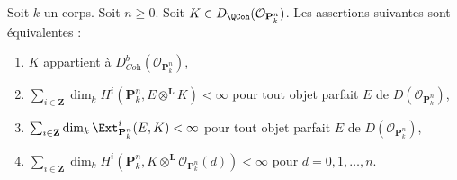 \begin{lemma}
\label{lemma-coherent-on-projective-space}
Soit $k$ un corps. Soit $n \geq 0$. Soit
$K \in D_\QCoh(\mathcal{O}_{\mathbf{P}^n_k})$.
Les assertions suivantes sont équivalentes :
\begin{enumerate}
\item $K$ appartient à $D^b_{\textit{Coh}}(\mathcal{O}_{\mathbf{P}^n_k})$,
\item $\sum_{i \in \mathbf{Z}}
\dim_k H^i(\mathbf{P}^n_k, E \otimes^\mathbf{L} K) < \infty$
pour tout objet parfait $E$ de
$D(\mathcal{O}_{\mathbf{P}^n_k})$,
\item $\sum_{i \in \mathbf{Z}}
\dim_k \Ext^i_{\mathbf{P}^n_k}(E, K) < \infty$
pour tout objet parfait $E$ de $D(\mathcal{O}_{\mathbf{P}^n_k})$,
\item $\sum_{i \in \mathbf{Z}} \dim_k H^i(\mathbf{P}^n_k,
K \otimes^\mathbf{L} \mathcal{O}_{\mathbf{P}^n_k}(d)) < \infty$
pour $d = 0, 1, \ldots, n$.
\end{enumerate}
\end{lemma}

